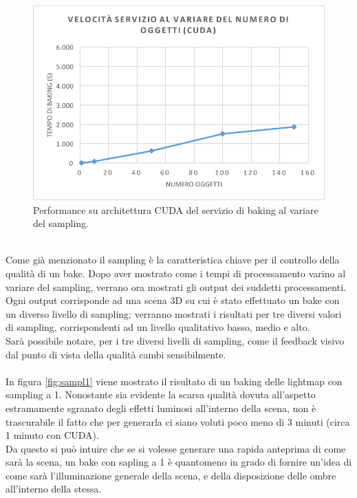 \\
\begin{figure}[htb]
 \centering
 \includegraphics[width=0.7\linewidth]{images/chapter_prove_sperimentali/grafico2.png}\hfill
 \caption[Performance CUDA variando sampling]{Performance su architettura CUDA del servizio di baking al variare del sampling.}
 \label{fig:grafico4}
\end{figure} 
\\
Come già menzionato il sampling è la caratteristica chiave per il controllo della qualità di un bake. Dopo aver mostrato come i tempi di processamento varino al variare del sampling, verrano ora mostrati gli output dei suddetti processamenti.
\\
Ogni output corrisponde ad una scena 3D su cui è stato effettuato un bake con un diverso livello di sampling; verranno mostrati i risultati per tre diversi valori di sampling, corrispondenti ad un livello qualitativo basso, medio e alto.
\\
Sarà possibile notare, per i tre diversi livelli di sampling, come il feedback visivo dal punto di vista della qualità cambi sensibilmente.
\\
\\
In figura \ref{fig:sampl1} viene mostrato il risultato di un baking delle lightmap con sampling a 1. Nonostante sia evidente la scarsa qualità dovuta all’aspetto estramamente sgranato degli effetti luminosi all’interno della scena, non è trascurabile il fatto che per generarla ci siano voluti poco meno di 3 minuti (circa 1 minuto con CUDA). 
\\
Da questo si può intuire che se si volesse generare una rapida anteprima di come sarà la scena, un bake con sapling a 1 è quantomeno in grado di fornire un’idea di come sarà l’illuminazione generale della scena, e della disposizione delle ombre all’interno della stessa.
\\
